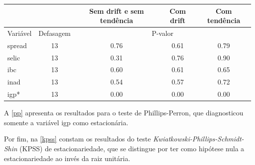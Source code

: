 \documentclass[a4paper,
               article,
               12pt,
               openany,
               oneside,
               english,
               brazil]{abntex2}
\numberwithin{equation}{section}
\begin{document}
    \begin{table}[!hbt]
        {%
            \begin{tabular}{lcccc}
                \midrule
                &           & \multicolumn{1}{C{3cm}}{Sem drift e sem tendência} & \multicolumn{1}{C{3cm}}{Com drift} & \multicolumn{1}{C{3cm}}{Com tendência} \\
                \midrule
                Variável & Defasagem & \multicolumn{3}{c}{P-valor} \\
                \midrule
                spread     &         13 &     0.76 &     0.61 &     0.79 \\
                selic      &         13 &     0.31 &     0.76 &     0.90 \\
                ibc        &         13 &     0.60 &     0.61 &     0.65 \\
                inad       &         13 &     0.54 &     0.57 &     0.72 \\
                igp*        &         13 &     0.00 &     0.00 &     0.00 \\
                \midrule
            \end{tabular}
            } 
            {}
    \end{table}

    A \autoref{pp} apresenta os resultados para o teste de Phillips-Perron, que diagnosticou somente a variável igp como estacionária.

    Por fim, na \autoref{kpss} constam os resultados do teste \textit{Kwiatkowski-Phillips-Schmidt-Shin} (KPSS) de estacionariedade, que se distingue por ter como hipótese nula a estacionariedade ao invés da raiz unitária.
\end{document}
